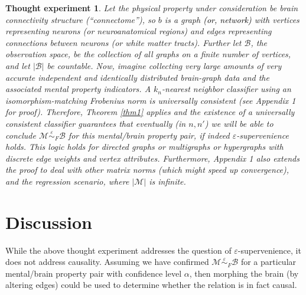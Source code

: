\documentclass{article}
\newcommand{\mB}{\mathcal{B}}
\newcommand{\mM}{\mathcal{M}}
\newcommand{\MeB}{\mM \overset{\varepsilon}{{\sim}}_F \mB}
\providecommand{\tr}[1]{\textcolor{black}{#1}}
\newtheorem{thex}{Thought experiment}
\begin{document}
\begin{thex}
Let the physical property under consideration be brain connectivity structure (``connectome''), so $b$ is a graph \tr{(or, network)} with vertices representing neurons (or neuroanatomical regions) and edges representing connections between neurons (or white matter tracts). Further let $\mB$, the observation space, be the collection of all graphs on a finite number of vertices, and let $|\mB|$ be countable. Now, imagine collecting very large amounts of very accurate independent and identically distributed brain-graph data and the associated mental property indicators. A $k_n$-nearest neighbor classifier using an isomorphism-matching Frobenius norm is universally consistent (see Appendix 1 for proof). Therefore, Theorem \ref{thm1} applies and the existence of a universally consistent classifier guarantees that eventually (in $n,n'$) we will be able to conclude $\MeB$ for this mental/brain property pair, if indeed $\varepsilon$-supervenience holds. This logic holds for directed graphs or multigraphs or hypergraphs with discrete edge weights and vertex attributes. Furthermore, Appendix 1 also extends the proof to deal with other matrix norms (which might speed up convergence), and the regression scenario, where $|\mM|$ is infinite.  
\end{thex}

\section{Discussion}

While the above thought experiment addresses the question of $\varepsilon$-supervenience, it does not address causality. Assuming we have confirmed $\MeB$ for a particular mental/brain property pair with confidence level $\alpha$, then morphing the brain (by altering edges) could be used to determine whether the relation is in fact causal.
\end{document}
